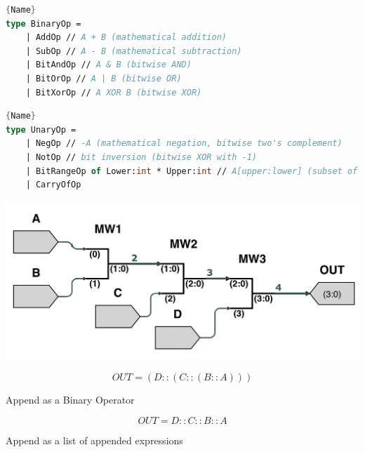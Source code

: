 \begin{center}
\noindent\begin{minipage}{.45\textwidth}
\begin{lstlisting}[caption=Definition for Binary Operators,frame=tlrb, language=FSharp, label=lst:binaryop]{Name}
type BinaryOp = 
    | AddOp // A + B (mathematical addition)
    | SubOp // A - B (mathematical subtraction)
    | BitAndOp // A & B (bitwise AND)
    | BitOrOp // A | B (bitwise OR)
    | BitXorOp // A XOR B (bitwise XOR)

\end{lstlisting}
\end{minipage}\hfill
\begin{minipage}{.45\textwidth}
\begin{lstlisting}[caption=Definition for Unary Operators,frame=tlrb, language=FSharp, label=lst:unaryop]{Name}
type UnaryOp = 
    | NegOp // -A (mathematical negation, bitwise two's complement)
    | NotOp // bit inversion (bitwise XOR with -1)
    | BitRangeOp of Lower:int * Upper:int // A[upper:lower] (subset of bits of A)
    | CarryOfOp
\end{lstlisting} 
\end{minipage}
\end{center}

\begin{center}
\noindent\begin{minipage}{.45\textwidth}
\vspace{-2ex}
\includegraphics[width=1.0\linewidth]{05.ImpPlan/mergewires.png}
\end{minipage}\hfill %
\begin{minipage}{.45\textwidth}
\begin{equation} \label{equ:longappend}
    OUT = (D::(C::(B::A)))
\end{equation}
\begin{center}
Append as a Binary Operator
\end{center}
\vspace{2em}
\begin{equation} \label{equ:shortappend}
    OUT = D::C::B::A
\end{equation}
\begin{center}
Append as a list of appended expressions
\end{center}
\end{minipage}
\end{center}

